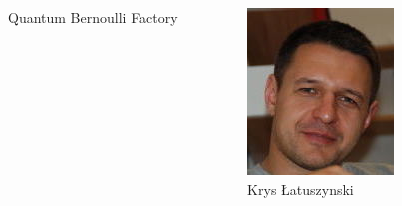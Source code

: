 \documentclass[aspectratio=169]{beamer}
\begin{document}
\begin{frame}
\begin{columns}
\begin{column}{0.45\textwidth}
{\LARGE Quantum Bernoulli Factory}
\end{column}
\begin{column}{0.25\textwidth}
\centering
\includegraphics[width=\textwidth]{krys.jpg}\\
Krys \L atuszynski
\end{column}
\begin{column}{0.25\textwidth}
\centering

\end{column}
\end{columns}
\end{frame}
\end{document}

